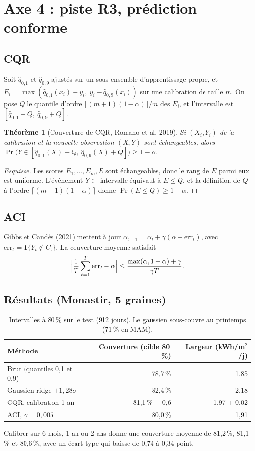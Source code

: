 \documentclass[11pt,a4paper]{article}
\newtheorem{theorem}{Théorème}[section]
\theoremstyle{remark}
\theoremstyle{definition}
\begin{document}
\section{Axe 4 : piste R3, prédiction conforme}\label{sec:ax4}
\subsection{CQR}
Soit $\hat q_{0,1}$ et $\hat q_{0,9}$ ajustés sur un sous-ensemble d'apprentissage propre, et $E_i = \max(\hat q_{0,1}(x_i) - y_i,\ y_i - \hat q_{0,9}(x_i))$ sur une calibration de taille $m$.
On pose $Q$ le quantile d'ordre $\lceil (m+1)(1-\alpha)\rceil/m$ des $E_i$, et l'intervalle est $[\hat q_{0,1}-Q,\ \hat q_{0,9}+Q]$.

\begin{theorem}[Couverture de CQR, Romano et al. 2019]
Si $(X_i,Y_i)$ de la calibration et la nouvelle observation $(X,Y)$ sont échangeables, alors
$\Pr\bigl(Y \in [\hat q_{0,1}(X) - Q,\ \hat q_{0,9}(X) + Q]\bigr) \ge 1-\alpha$.
\end{theorem}
\begin{proof}[Esquisse]
Les scores $E_1,\dots,E_m,E$ sont échangeables, donc le rang de $E$ parmi eux est uniforme. L'événement $Y\in$ intervalle équivaut à $E \le Q$,
et la définition de $Q$ à l'ordre $\lceil(m+1)(1-\alpha)\rceil$ donne $\Pr(E \le Q) \ge 1-\alpha$.
\end{proof}

\subsection{ACI}
Gibbs et Candès (2021) mettent à jour $\alpha_{t+1} = \alpha_t + \gamma(\alpha - \mathrm{err}_t)$, avec $\mathrm{err}_t = \mathbf{1}\{Y_t \notin C_t\}$.
La couverture moyenne satisfait
\[
\Bigl|\frac1T\sum_{t=1}^T \mathrm{err}_t - \alpha\Bigr| \le \frac{\max(\alpha, 1-\alpha) + \gamma}{\gamma T}.
\]

\subsection{Résultats (Monastir, 5 graines)}
\begin{table}[h]\centering
\begin{tabular}{lrr}
\toprule
Méthode & Couverture (cible 80\,\%) & Largeur (kWh/m$^2$/j) \\
\midrule
Brut (quantiles 0,1 et 0,9) & 78,7\,\% & 1,85 \\
Gaussien ridge $\pm 1{,}28\sigma$ & 82,4\,\% & 2,18 \\
CQR, calibration 1 an & 81,1\,\% $\pm$ 0,6 & 1,97 $\pm$ 0,02 \\
ACI, $\gamma = 0{,}005$ & 80,0\,\% & 1,91 \\
\bottomrule
\end{tabular}
\caption{Intervalles à 80\,\% sur le test (912 jours). Le gaussien sous-couvre au printemps (71\,\% en MAM).}
\end{table}
Calibrer sur 6 mois, 1 an ou 2 ans donne une couverture moyenne de 81,2\,\%, 81,1\,\% et 80,6\,\%, avec un écart-type qui baisse de 0,74 à 0,34 point.
\end{document}
